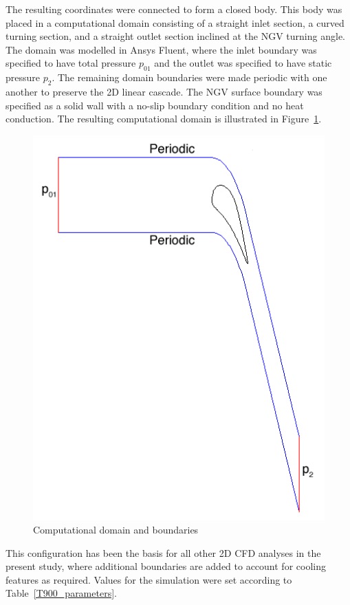 \documentclass[a4paper, 11pt, twoside]{report}
\begin{document}
The resulting coordinates were connected to form a closed body. This body was placed in a computational domain consisting of a straight inlet section, a curved turning section, and a straight outlet section inclined at the NGV turning angle. The domain was modelled in Ansys Fluent, where the inlet boundary was specified to have total pressure $p_{01}$ and the outlet was specified to have static pressure $p_2$. The remaining domain boundaries were made periodic with one another to preserve the 2D linear cascade. The NGV surface boundary was specified as a solid wall with a no-slip boundary condition and no heat conduction. The resulting computational domain is illustrated in Figure~\ref{fig:computational_domain_and_boundaries}.

\begin{figure}[H]
	\centering
	\includegraphics[width=.6\textwidth]{figs/domain_boundary_conditions.png}
	\caption{Computational domain and boundaries}
	\label{fig:computational_domain_and_boundaries}
\end{figure}

This configuration has been the basis for all other 2D CFD analyses in the present study, where additional boundaries are added to account for cooling features as required. Values for the simulation were set according to Table~\ref{T900_parameters}.
\end{document}
